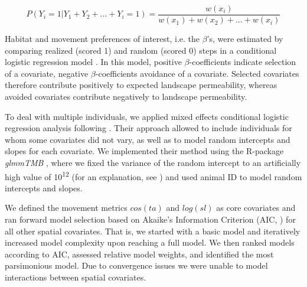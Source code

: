 \documentclass[abstract=on,10pt,a4paper,bibliography=totocnumbered]{scrartcl}
\begin{document}
\begin{equation}
\label{EQ3}
  P(Y_{i} = 1 | Y_{1} + Y_{2} + ... + Y_{i} = 1) =
  \frac{w(x_{i})}{w(x_{1}) + w(x_{2}) + ... + w(x_{i})}
\end{equation}

\noindent Habitat and movement preferences of interest, i.e. the \(\beta\)'s,
were estimated by comparing realized (scored 1) and random (scored 0) steps in a
conditional logistic regression model \citep{Fortin.2005}. In this model,
positive \(\beta\)-coefficients indicate selection of a covariate, negative
\(\beta\)-coefficients avoidance of a covariate. Selected covariates therefore
contribute positively to expected landscape permeability, whereas avoided
covariates contribute negatively to landscape permeability.

To deal with multiple individuals, we applied mixed effects conditional logistic
regression analysis following \cite{Muff.2019}. Their approach allowed to
include individuals for whom some covariates did not vary, as well as to model
random intercepts and slopes for each covariate. We implemented their method
using the R-package \textit{glmmTMB} \citep{Mollie.2017}, where we fixed the
variance of the random intercept to an artificially high value of
10\textsuperscript{12} (for an explanation, see \cite{Muff.2019}) and used
animal ID to model random intercepts and slopes.

We defined the movement metrics \(cos(ta)\) and \(log(sl)\) as core covariates
and ran forward model selection based on Akaike's Information Criterion (AIC,
\cite{Burnham.2002}) for all other spatial covariates. That is, we started with
a basic model and iteratively increased model complexity upon reaching a
full model. We then ranked models according to AIC, assessed relative model
weights, and identified the most parsimonious model. Due to convergence issues
we were unable to model interactions between spatial covariates.
\end{document}
